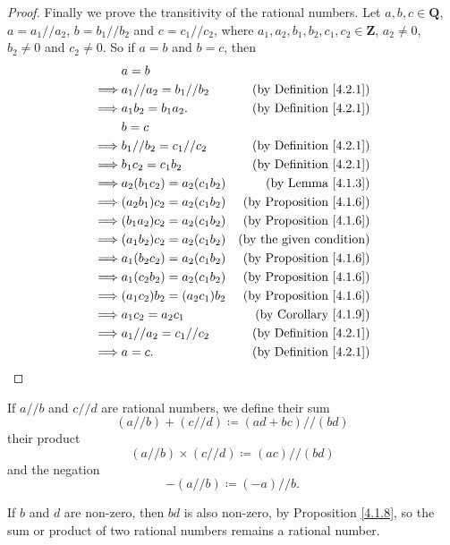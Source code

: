 \begin{proof}
Finally we prove the transitivity of the rational numbers.
Let \(a, b, c \in \mathbf{Q}\), \(a = a_1 // a_2\), \(b = b_1 // b_2\) and \(c = c_1 // c_2\), where \(a_1, a_2, b_1, b_2, c_1, c_2 \in \mathbf{Z}\), \(a_2 \neq 0\), \(b_2 \neq 0\) and \(c_2 \neq 0\).
So if \(a = b\) and \(b = c\), then
\begin{align*}
& a = b \\
\implies & a_1 // a_2 = b_1 // b_2 & \text{(by Definition \ref{4.2.1})} \\
\implies & a_1b_2 = b_1a_2. & \text{(by Definition \ref{4.2.1})} \\
& b = c \\
\implies & b_1 // b_2 = c_1 // c_2 & \text{(by Definition \ref{4.2.1})} \\
\implies & b_1c_2 = c_1b_2 & \text{(by Definition \ref{4.2.1})} \\
\implies & a_2(b_1c_2) = a_2(c_1b_2) & \text{(by Lemma \ref{4.1.3})} \\
\implies & (a_2b_1)c_2 = a_2(c_1b_2) & \text{(by Proposition \ref{4.1.6})} \\
\implies & (b_1a_2)c_2 = a_2(c_1b_2) & \text{(by Proposition \ref{4.1.6})} \\
\implies & (a_1b_2)c_2 = a_2(c_1b_2) & \text{(by the given condition)} \\
\implies & a_1(b_2c_2) = a_2(c_1b_2) & \text{(by Proposition \ref{4.1.6})} \\
\implies & a_1(c_2b_2) = a_2(c_1b_2) & \text{(by Proposition \ref{4.1.6})} \\
\implies & (a_1c_2)b_2 = (a_2c_1)b_2 & \text{(by Proposition \ref{4.1.6})} \\
\implies & a_1c_2 = a_2c_1 & \text{(by Corollary \ref{4.1.9})} \\
\implies & a_1 // a_2 = c_1 // c_2 & \text{(by Definition \ref{4.2.1})} \\
\implies & a = c. & \text{(by Definition \ref{4.2.1})}
\end{align*}
\end{proof}

\begin{definition}\label{4.2.2}
If \(a // b\) and \(c // d\) are rational numbers, we define their sum
\[
    (a // b) + (c // d) \coloneqq (ad + bc) // (bd)
\]
their product
\[
    (a // b) \times (c // d) \coloneqq (ac) // (bd)
\]
and the negation
\[
    -(a // b) \coloneqq (-a) // b.
\]
\end{definition}

\begin{note}
If \(b\) and \(d\) are non-zero, then \(bd\) is also non-zero, by Proposition \ref{4.1.8}, so the sum or product of two rational numbers remains a rational number.
\end{note}

